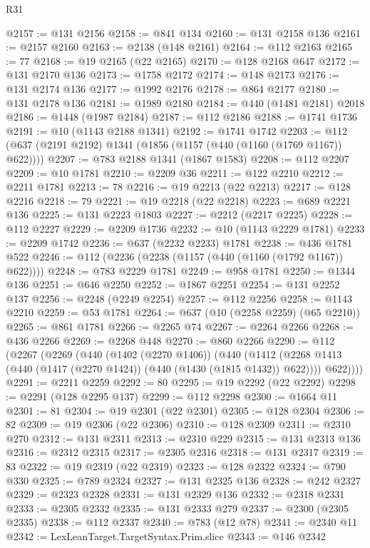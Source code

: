 \begin{lexlean}{R31}
\begin{coremodule}
@2157 := @131 @2156
@2158 := @841 @134
@2160 := @131 @2158 @136
@2161 := @2157 @2160
@2163 := @2138 (@148 @2161)
@2164 := @112 @2163
@2165 := 77
@2168 := @19 @2165 (@22 @2165)
@2170 := @128 @2168 @647
@2172 := @131 @2170 @136
@2173 := @1758 @2172
@2174 := @148 @2173
@2176 := @131 @2174 @136
@2177 := @1992 @2176
@2178 := @864 @2177
@2180 := @131 @2178 @136
@2181 := @1989 @2180
@2184 := @440 (@1481 @2181) @2018
@2186 := @1448 (@1987 @2184)
@2187 := @112 @2186
@2188 := @1741 @1736
@2191 := @10 (@1143 @2188 @1341)
@2192 := @1741 @1742
@2203 := @112 (@637 (@2191 @2192) @1341 (@1856 (@1157 (@440 (@1160 (@1769 @1167)) @622))))
@2207 := @783 @2188 @1341 (@1867 @1583)
@2208 := @112 @2207
@2209 := @10 @1781
@2210 := @2209 @36
@2211 := @122 @2210
@2212 := @2211 @1781
@2213 := 78
@2216 := @19 @2213 (@22 @2213)
@2217 := @128 @2216
@2218 := 79
@2221 := @19 @2218 (@22 @2218)
@2223 := @689 @2221 @136
@2225 := @131 @2223 @1803
@2227 := @2212 (@2217 @2225)
@2228 := @112 @2227
@2229 := @2209 @1736
@2232 := @10 (@1143 @2229 @1781)
@2233 := @2209 @1742
@2236 := @637 (@2232 @2233) @1781
@2238 := @436 @1781 @522
@2246 := @112 (@2236 (@2238 (@1157 (@440 (@1160 (@1792 @1167)) @622))))
@2248 := @783 @2229 @1781
@2249 := @958 @1781
@2250 := @1344 @136
@2251 := @646 @2250
@2252 := @1867 @2251
@2254 := @131 @2252 @137
@2256 := @2248 (@2249 @2254)
@2257 := @112 @2256
@2258 := @1143 @2210
@2259 := @53 @1781
@2264 := @637 (@10 (@2258 @2259) (@65 @2210))
@2265 := @861 @1781
@2266 := @2265 @74
@2267 := @2264 @2266
@2268 := @436 @2266
@2269 := @2268 @448
@2270 := @860 @2266
@2290 := @112
    (@2267
      (@2269
        (@440
          (@1402 (@2270 @1406))
          (@440
            (@1412 (@2268 @1413 (@440 (@1417 (@2270 @1424)) (@440 (@1430 (@1815 @1432)) @622))))
            @622))))
@2291 := @2211 @2259
@2292 := 80
@2295 := @19 @2292 (@22 @2292)
@2298 := @2291 (@128 @2295 @137)
@2299 := @112 @2298
@2300 := @1664 @11
@2301 := 81
@2304 := @19 @2301 (@22 @2301)
@2305 := @128 @2304
@2306 := 82
@2309 := @19 @2306 (@22 @2306)
@2310 := @128 @2309
@2311 := @2310 @270
@2312 := @131 @2311
@2313 := @2310 @229
@2315 := @131 @2313 @136
@2316 := @2312 @2315
@2317 := @2305 @2316
@2318 := @131 @2317
@2319 := 83
@2322 := @19 @2319 (@22 @2319)
@2323 := @128 @2322
@2324 := @790 @330
@2325 := @789 @2324
@2327 := @131 @2325 @136
@2328 := @242 @2327
@2329 := @2323 @2328
@2331 := @131 @2329 @136
@2332 := @2318 @2331
@2333 := @2305 @2332
@2335 := @131 @2333 @279
@2337 := @2300 (@2305 @2335)
@2338 := @112 @2337
@2340 := @783 (@12 @78)
@2341 := @2340 @11
@2342 := LexLeanTarget.TargetSyntax.Prim.slice
@2343 := @146 @2342

\end{coremodule}
\end{lexlean}
